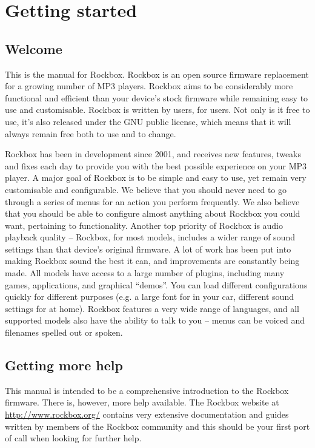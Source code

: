 \chapter{Getting started}
\section{Welcome}
This is the manual for Rockbox. Rockbox is an open source firmware replacement
for a growing number of MP3 players. Rockbox aims to be considerably more
functional and efficient than your device's stock firmware while remaining easy
to use and customisable. Rockbox is written by users, for users. Not only is it
free to use, it's also released under the GNU public license, which means that
it will always remain free both to use and to change.

Rockbox has been in development since 2001, and receives new features, tweaks
and fixes each day to provide you with the best possible experience on your MP3
player. A major goal of Rockbox is to be simple and easy to use, yet remain very
customisable and configurable. We believe that you should never need to go
through a series of menus for an action you perform frequently. We also believe
that you should be able to configure almost anything about Rockbox you could
want, pertaining to functionality. Another top priority of Rockbox is audio
playback quality -- Rockbox, for most models, includes a wider range of sound
settings than that device's original firmware. A lot of work has been put into
making Rockbox sound the best it can, and improvements are constantly being made.
All models have access to a large number of plugins, including many games,
applications, and graphical ``demos''. You can load different configurations
quickly for different purposes (e.g. a large font for in your car, different
sound settings for at home). Rockbox features a very wide range of languages, and
all supported models also have the ability to talk to you -- menus can be voiced
and filenames spelled out or spoken.

\section{Getting more help}
This manual is intended to be a comprehensive introduction to the Rockbox
firmware. There is, however, more help available.  The Rockbox website at
\url{http://www.rockbox.org/} contains very extensive documentation and guides
written by members of the Rockbox community and this should be your first port
of call when looking for further help.

